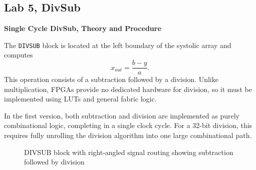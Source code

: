 \documentclass[a4paper,12pt]{article}
\begin{document}
\subsection{Lab 5, DivSub}

\textbf{Single Cycle DivSub, Theory and Procedure}

The \texttt{DIVSUB} block is located at the left boundary of the systolic array and computes
\begin{equation}
x_{out} = \frac{b - y}{a}.
\end{equation}
This operation consists of a subtraction followed by a division. Unlike multiplication, FPGAs provide no dedicated hardware for division, so it must be implemented using LUTs and general fabric logic.

In the first version, both subtraction and division are implemented as purely combinational logic, completing in a single clock cycle. For a 32-bit division, this requires fully unrolling the division algorithm into one large combinational path.

\begin{figure}[h]
\centering
{}
\caption{DIVSUB block with right-angled signal routing showing subtraction followed by division}
\end{figure}
\end{document}
